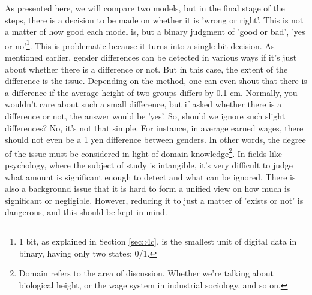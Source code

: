 \documentclass{ltjsbook}
\begin{document}
As presented here, we will compare two models, but in the final stage of the steps, there is a decision to be made on whether it is 'wrong or right'. This is not a matter of how good each model is, but a binary judgment of 'good or bad', 'yes or no'\footnote{1 bit, as explained in Section \ref{sec::4c}, is the smallest unit of digital data in binary, having only two states: 0/1.}. This is problematic because it turns into a single-bit decision. As mentioned earlier, gender differences can be detected in various ways if it's just about whether there is a difference or not. But in this case, the extent of the difference is the issue. Depending on the method, one can even shout that there is a difference if the average height of two groups differs by 0.1 cm. Normally, you wouldn't care about such a small difference, but if asked whether there is a difference or not, the answer would be 'yes'. So, should we ignore such slight differences? No, it's not that simple. For instance, in average earned wages, there should not even be a 1 yen difference between genders. In other words, the degree of the issue must be considered in light of domain knowledge\footnote{Domain refers to the area of discussion. Whether we're talking about biological height, or the wage system in industrial sociology, and so on.}. In fields like psychology, where the subject of study is intangible, it's very difficult to judge what amount is significant enough to detect and what can be ignored. There is also a background issue that it is hard to form a unified view on how much is significant or negligible. However, reducing it to just a matter of 'exists or not' is dangerous, and this should be kept in mind.
\end{document}
